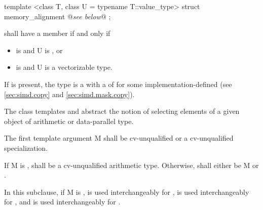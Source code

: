 \begin{itemdecl}
template <class T, class U = typename T::value_type> struct memory_alignment { @\emph{see below}@ };
\end{itemdecl}
\begin{itemdescr}
  \pnum
   shall have a member  if and only if
  \begin{itemize}
    \item {} is \true and \type U is \bool, or
    \item {} is \true and \type U is a vectorizable type.
  \end{itemize}

  \pnum
  If  is present, the type  is a \BinaryTypeTrait with a \BaseCharacteristic of  for some implementation-defined  (see \ref{sec:simd.copy} and \ref{sec:simd.mask.copy}).

  \pnum{}
\end{itemdescr}



\pnum The class templates  and  abstract the notion of selecting elements of a given object of arithmetic or data-parallel type.

\pnum The first template argument \type M shall be cv-unqualified \bool or a cv-unqualified \mask specialization.

\pnum
If \type M is \bool,  shall be a cv-unqualified arithmetic type. %
Otherwise,  shall either be \type M or .


\pnum In this subclause, if \type M is \bool,  is used interchangeably for ,
 is used interchangeably for , and
 is used interchangeably for .

